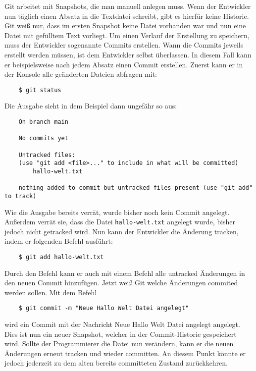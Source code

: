 Git arbeitet mit Snapshots, die man manuell anlegen muss. Wenn der Entwickler
nun täglich einen Absatz in die Textdatei schreibt, gibt es hierfür keine
Historie. Git weiß nur, dass im ersten Snapshot keine Datei vorhanden war und
nun eine Datei mit gefülltem Text vorliegt. Um einen Verlauf der Erstellung
zu speichern, muss der Entwickler sogenannte Commits erstellen. Wann die Commits
jeweils erstellt werden müssen, ist dem Entwickler selbst überlassen. In diesem
Fall kann er beispielsweise nach jedem Absatz einen Commit erstellen. Zuerst
kann er in der Konsole alle geänderten Dateien abfragen mit:

\begin{lstlisting}
    $ git status
\end{lstlisting}

Die Ausgabe sieht in dem Beispiel dann ungefähr so aus:

\begin{lstlisting}
    On branch main

    No commits yet

    Untracked files:
    (use "git add <file>..." to include in what will be committed)
        hallo-welt.txt

    nothing added to commit but untracked files present (use "git add" to track)
\end{lstlisting}

\newpage
Wie die Ausgabe bereits verrät, wurde bisher noch kein Commit angelegt. Außerdem
verrät sie, dass die Datei \texttt{hallo-welt.txt} angelegt wurde, bisher jedoch
nicht getracked wird. Nun kann der Entwickler die Änderung tracken, indem er
folgenden Befehl ausführt:

\begin{lstlisting}
    $ git add hallo-welt.txt
\end{lstlisting}

Durch den Befehl  kann er auch mit einem Befehl alle
\glqq untracked\grqq{} Änderungen in den neuen Commit hinzufügen. Jetzt weiß
Git welche Änderungen commited werden sollen. Mit dem Befehl

\begin{lstlisting}
    $ git commit -m "Neue Hallo Welt Datei angelegt"
\end{lstlisting}

wird ein Commit mit der Nachricht \glqq Neue Hallo Welt Datei angelegt\grqq{}
angelegt. Dies ist nun ein neuer Snapshot, welcher in der Commit-Historie
gespeichert wird. Sollte der Programmierer die Datei nun verändern, kann er die
neuen Änderungen erneut tracken und wieder committen. An diesem Punkt könnte er
jedoch jederzeit zu dem alten bereits committeten Zustand zurückkehren.

